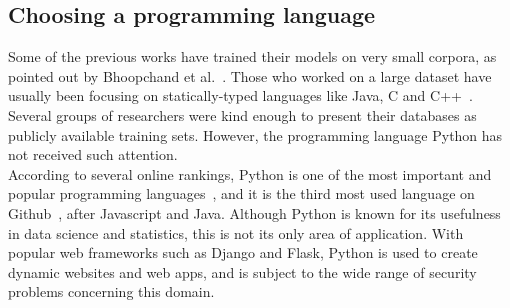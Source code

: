 \documentclass[
a4paper,
pagesize,
pdftex,
12pt,
twoside, %
BCOR=5mm, %
ngerman,
fleqn,
final,
]{scrartcl}
\begin{document}
	\subsection{Choosing a programming language}
	Some of the previous works have trained their models on very small corpora, as pointed out by Bhoopchand et al.~\cite{Bhoopchand.2016}. Those who worked on a large dataset have usually been focusing on statically-typed languages like Java, C and C++~\cite{Bellon.2007,Russell.2018,Liu.2018,Dam.2017, Rolim.2018}. Several groups of researchers were kind enough to present their databases as publicly available training sets. However, the programming language Python has not received such attention. \\
	According to several online rankings, Python is one of the most important and popular programming languages~\cite{AyeshaCuthbert.15.4.2019, VidushiDwivedi.}, and it is the third most used language on Github~\cite{Github.com.19}, after Javascript and Java. Although Python is known for its usefulness in data science and statistics, this is not its only area of application. With popular web frameworks such as Django and Flask, Python is used to create dynamic websites and web apps, and is subject to the wide range of security problems concerning this domain.\\
	
\end{document}
